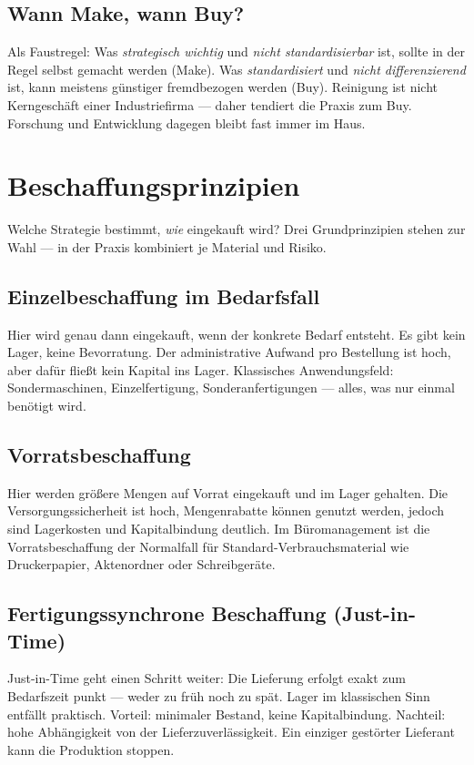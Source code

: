 \documentclass[11pt, a4paper]{article}
\begin{document}
\subsection{Wann Make, wann Buy?}

Als Faustregel: Was \emph{strategisch wichtig} und \emph{nicht standardisierbar} ist,
sollte in der Regel selbst gemacht werden (Make). Was \emph{standardisiert} und
\emph{nicht differenzierend} ist, kann meistens günstiger fremdbezogen werden (Buy).
Reinigung ist nicht Kerngeschäft einer Industriefirma --- daher tendiert die Praxis
zum Buy. Forschung und Entwicklung dagegen bleibt fast immer im Haus.

\section{Beschaffungsprinzipien}

Welche Strategie bestimmt, \emph{wie} eingekauft wird? Drei Grundprinzipien stehen
zur Wahl --- in der Praxis kombiniert je Material und Risiko.

\subsection{Einzelbeschaffung im Bedarfsfall}

Hier wird genau dann eingekauft, wenn der konkrete Bedarf entsteht. Es gibt kein Lager,
keine Bevorratung. Der administrative Aufwand pro Bestellung ist hoch, aber dafür
fließt kein Kapital ins Lager. Klassisches Anwendungsfeld: Sondermaschinen,
Einzelfertigung, Sonder­anfertigungen --- alles, was nur einmal benötigt wird.

\subsection{Vorratsbeschaffung}

Hier werden größere Mengen auf Vorrat eingekauft und im Lager gehalten. Die
Versorgungssicherheit ist hoch, Mengenrabatte können genutzt werden, jedoch sind
Lagerkosten und Kapitalbindung deutlich. Im Büromanagement ist die Vorratsbeschaffung
der Normalfall für Standard-Verbrauchsmaterial wie Druckerpapier, Aktenordner oder
Schreibgeräte.

\subsection{Fertigungssynchrone Beschaffung (Just-in-Time)}

Just-in-Time geht einen Schritt weiter: Die Lieferung erfolgt exakt zum Bedarfszeit­
punkt --- weder zu früh noch zu spät. Lager im klassischen Sinn entfällt praktisch.
Vorteil: minimaler Bestand, keine Kapitalbindung. Nachteil: hohe Abhängigkeit von der
Lieferzuverlässigkeit. Ein einziger gestörter Lieferant kann die Produktion stoppen.
\end{document}
